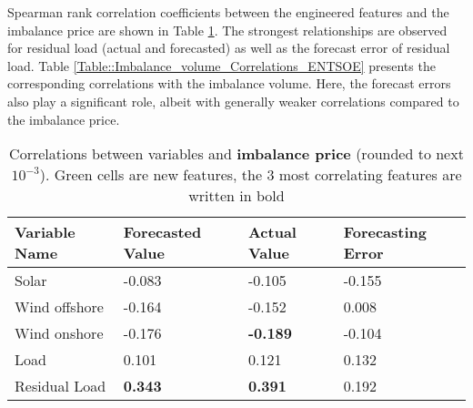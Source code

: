 \documentclass[class=scrbook, crop=false]{standalone}
\begin{document}
Spearman rank correlation coefficients between the engineered features and the imbalance price are shown in Table \ref{Table::Rebap_Correlations_ENTSOE}. The strongest relationships are observed for residual load (actual and forecasted) as well as the forecast error of residual load.
Table \ref{Table::Imbalance_volume_Correlations_ENTSOE} presents the corresponding correlations with the imbalance volume. Here, the forecast errors also play a significant role, albeit with generally weaker correlations compared to the imbalance price.



    
    

    \begin{table}
    \centering
    \begin{tabular}{l|l|l|l}
    Variable Name	&Forecasted Value& Actual Value	& Forecasting Error \\\hline
    Solar 		& -0.083		& -0.105		& \cellcolor{green} -0.155 \\
    Wind offshore 	& -0.164		& -0.152		& \cellcolor{green} 0.008 \\
    Wind onshore 	& -0.176		& \textbf{-0.189}	& \cellcolor{green} -0.104 \\
    Load 		&0.101		& 0.121		& \cellcolor{green}  0.132 \\
    Residual Load 	& \cellcolor{green} \textbf{0.343}& \cellcolor{green} \textbf{0.391}& \cellcolor{green}0.192\\
    \end{tabular}

    
    \caption{Correlations between variables and \textbf{imbalance price} (rounded to next $10^{-3}$). Green cells are new features, the 3 most correlating features are written in bold}
    \label{Table::Rebap_Correlations_ENTSOE}
    \end{table}
\end{document}
